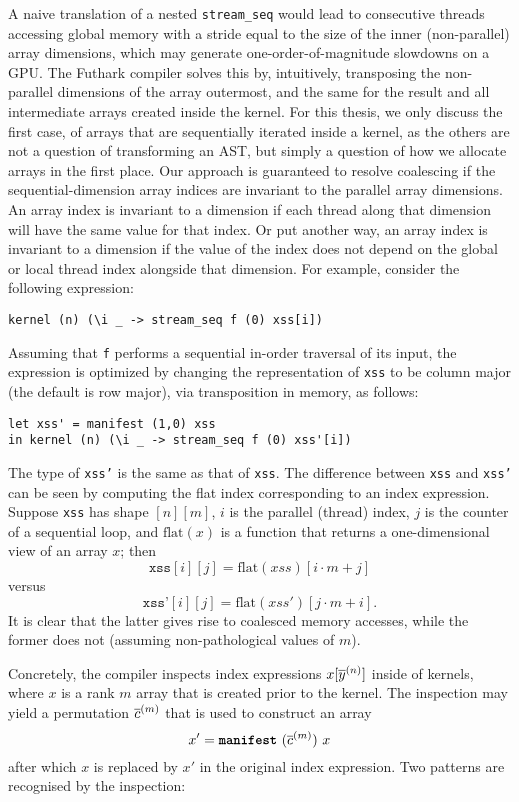 A naive translation of a nested \lstinline{stream_seq} would lead to
consecutive threads accessing global memory with a stride equal to the
size of the inner (non-parallel) array dimensions, which may generate
one-order-of-magnitude slowdowns on a GPU.
%
The Futhark compiler solves this by, intuitively, transposing the
non-parallel dimensions of the array outermost, and the same for the
result and all intermediate arrays created inside the kernel.  For
this thesis, we only discuss the first case, of arrays that are
sequentially iterated inside a kernel, as the others are not a
question of transforming an AST, but simply a question of how we
allocate arrays in the first place.  Our approach is guaranteed to
resolve coalescing if the sequential-dimension array indices are
invariant to the parallel array dimensions.  An array index is
invariant to a dimension if each thread along that dimension will have
the same value for that index.  Or put another way, an array index is
invariant to a dimension if the value of the index does not depend on
the global or local thread index alongside that dimension.  For
example, consider the following expression:
\begin{lstlisting}[numbers=none]
kernel (n) (\i _ -> stream_seq f (0) xss[i])
\end{lstlisting}
Assuming that
\lstinline{f} performs a sequential in-order traversal of its input,
the expression is optimized by changing the representation of
\texttt{xss} to be column major (the default is row major), via
transposition in memory, as follows:

\begin{lstlisting}[numbers=none]
let xss' = manifest (1,0) xss
in kernel (n) (\i _ -> stream_seq f (0) xss'[i])
\end{lstlisting}

The type of \texttt{xss'} is the same as that of \texttt{xss}.  The
difference between \texttt{xss} and \texttt{xss'} can be seen by
computing the flat index corresponding to an index expression.
Suppose \texttt{xss} has shape $[n][m]$, $i$ is the parallel (thread)
index, $j$ is the counter of a sequential loop, and $\textrm{flat}(x)$
is a function that returns a one-dimensional view of an array $x$;
then
\[
  \texttt{xss}[i][j] = \textrm{flat}(xss)[i\cdot{}m+j]
\]
versus
\[
  \texttt{xss'}[i][j] = \textrm{flat}(xss')[j\cdot{}m+i].
\]
It is clear that the latter gives rise to coalesced memory accesses,
while the former does not (assuming non-pathological values of $m$).

Concretely, the compiler inspects index expressions $x[\overline{y}^{(n)}]$
inside of kernels, where $x$ is a rank $m$ array that is created prior
to the kernel.  The inspection may yield a permutation $\overline{c}^{(m)}$
that is used to construct an array
\[
  x' = \mbox{\texttt{\bfseries{manifest}}}~(\overline{c}^{(m)})~x
\]
after which $x$ is replaced by $x'$ in the original index expression.
Two patterns are recognised by the inspection:

